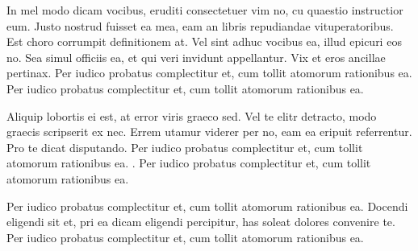 In mel modo dicam vocibus, eruditi consectetuer vim no, cu quaestio 
instructior eum. Justo nostrud fuisset ea mea, eam an libris repudiandae 
vituperatoribus. Est choro corrumpit definitionem at. Vel sint adhuc vocibus 
ea, illud epicuri eos no. Sea simul officiis ea, et qui veri invidunt 
appellantur. Vix et eros ancillae pertinax. 
\cite{GROMACS4,GULP_01,GULP_02,HYPRE_01,LAMMPS_01}
Per iudico probatus complectitur et, cum tollit atomorum rationibus ea.
Per iudico probatus complectitur et, cum tollit atomorum rationibus ea.

Aliquip lobortis ei est, at error viris graeco sed. Vel te elitr detracto, 
modo graecis scripserit ex nec. Errem utamur viderer per no, eam ea eripuit 
referrentur. Pro te dicat disputando. Per iudico probatus complectitur et, 
cum tollit atomorum rationibus ea. \cite{R_01,SIESTA_01,SIESTA_02,SMEAGOL_01}.
Per iudico probatus complectitur et, cum tollit atomorum rationibus ea.

Per iudico probatus complectitur et, cum tollit atomorum rationibus ea.
Docendi eligendi sit et, pri ea dicam eligendi percipitur, has soleat 
dolores convenire te. Per iudico probatus complectitur et, cum tollit 
atomorum rationibus ea.
